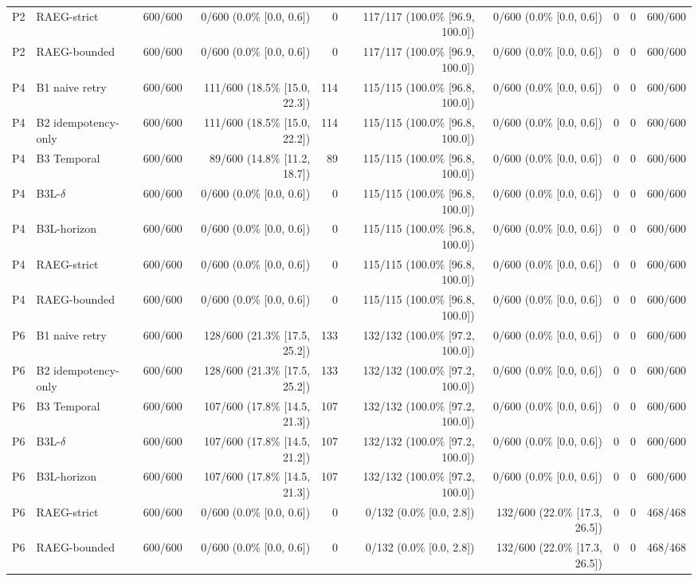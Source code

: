 \begin{table}[t]
\begin{tabular}{llrrrrrrrr}
P2 & RAEG-strict & 600/600 & 0/600 (0.0\% [0.0, 0.6]) & 0 & 117/117 (100.0\% [96.9, 100.0]) & 0/600 (0.0\% [0.0, 0.6]) & 0 & 0 & 600/600 \\
P2 & RAEG-bounded & 600/600 & 0/600 (0.0\% [0.0, 0.6]) & 0 & 117/117 (100.0\% [96.9, 100.0]) & 0/600 (0.0\% [0.0, 0.6]) & 0 & 0 & 600/600 \\
P4 & B1 naive retry & 600/600 & 111/600 (18.5\% [15.0, 22.3]) & 114 & 115/115 (100.0\% [96.8, 100.0]) & 0/600 (0.0\% [0.0, 0.6]) & 0 & 0 & 600/600 \\
P4 & B2 idempotency-only & 600/600 & 111/600 (18.5\% [15.0, 22.2]) & 114 & 115/115 (100.0\% [96.8, 100.0]) & 0/600 (0.0\% [0.0, 0.6]) & 0 & 0 & 600/600 \\
P4 & B3 Temporal & 600/600 & 89/600 (14.8\% [11.2, 18.7]) & 89 & 115/115 (100.0\% [96.8, 100.0]) & 0/600 (0.0\% [0.0, 0.6]) & 0 & 0 & 600/600 \\
P4 & B3L-$\delta$ & 600/600 & 0/600 (0.0\% [0.0, 0.6]) & 0 & 115/115 (100.0\% [96.8, 100.0]) & 0/600 (0.0\% [0.0, 0.6]) & 0 & 0 & 600/600 \\
P4 & B3L-horizon & 600/600 & 0/600 (0.0\% [0.0, 0.6]) & 0 & 115/115 (100.0\% [96.8, 100.0]) & 0/600 (0.0\% [0.0, 0.6]) & 0 & 0 & 600/600 \\
P4 & RAEG-strict & 600/600 & 0/600 (0.0\% [0.0, 0.6]) & 0 & 115/115 (100.0\% [96.8, 100.0]) & 0/600 (0.0\% [0.0, 0.6]) & 0 & 0 & 600/600 \\
P4 & RAEG-bounded & 600/600 & 0/600 (0.0\% [0.0, 0.6]) & 0 & 115/115 (100.0\% [96.8, 100.0]) & 0/600 (0.0\% [0.0, 0.6]) & 0 & 0 & 600/600 \\
P6 & B1 naive retry & 600/600 & 128/600 (21.3\% [17.5, 25.2]) & 133 & 132/132 (100.0\% [97.2, 100.0]) & 0/600 (0.0\% [0.0, 0.6]) & 0 & 0 & 600/600 \\
P6 & B2 idempotency-only & 600/600 & 128/600 (21.3\% [17.5, 25.2]) & 133 & 132/132 (100.0\% [97.2, 100.0]) & 0/600 (0.0\% [0.0, 0.6]) & 0 & 0 & 600/600 \\
P6 & B3 Temporal & 600/600 & 107/600 (17.8\% [14.5, 21.3]) & 107 & 132/132 (100.0\% [97.2, 100.0]) & 0/600 (0.0\% [0.0, 0.6]) & 0 & 0 & 600/600 \\
P6 & B3L-$\delta$ & 600/600 & 107/600 (17.8\% [14.5, 21.2]) & 107 & 132/132 (100.0\% [97.2, 100.0]) & 0/600 (0.0\% [0.0, 0.6]) & 0 & 0 & 600/600 \\
P6 & B3L-horizon & 600/600 & 107/600 (17.8\% [14.5, 21.3]) & 107 & 132/132 (100.0\% [97.2, 100.0]) & 0/600 (0.0\% [0.0, 0.6]) & 0 & 0 & 600/600 \\
P6 & RAEG-strict & 600/600 & 0/600 (0.0\% [0.0, 0.6]) & 0 & 0/132 (0.0\% [0.0, 2.8]) & 132/600 (22.0\% [17.3, 26.5]) & 0 & 0 & 468/468 \\
P6 & RAEG-bounded & 600/600 & 0/600 (0.0\% [0.0, 0.6]) & 0 & 0/132 (0.0\% [0.0, 2.8]) & 132/600 (22.0\% [17.3, 26.5]) & 0 & 0 & 468/468 \\
\bottomrule
\end{tabular}
\end{table}
